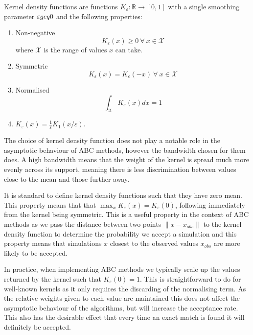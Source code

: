 \documentclass[11pt,a4paper]{article}
\theoremstyle{break}
\begin{document}
  \begin{box_definition}
    Kernel density functions are functions $K_\varepsilon:\mathbb{R}\to[0,1]$ with a single smoothing parameter $\varepsilon\\geq0$ and the following properties:
    \begin{enumerate}
      \item Non-negative
      \[ K_\varepsilon(x)\geq0\ \forall\ x\in\mathcal{X} \]
      where $\mathcal{X}$ is the range of values $x$ can take.
      \item Symmetric
      \[ K_\varepsilon(x)=K_\varepsilon(-x)\ \forall\ x\in\mathcal{X} \]
      \item Normalised
      \[ \int_{\mathcal{X}}K_\varepsilon(x)dx=1 \]
      \item $K_\varepsilon(x)=\frac1\varepsilon K_1(x/\varepsilon)$.
    \end{enumerate}
  \end{box_definition}

  \par The choice of kernel density function does not play a notable role in the asymptotic behaviour of ABC methods, however the bandwidth chosen for them does. A high bandwidth means that the weight of the kernel is spread much more evenly across its support, meaning there is less discrimination between values close to the mean and those further away.

  \par It is standard to define kernel density functions such that they have zero mean. This property means that that $\max_xK_\varepsilon(x)=K_\varepsilon(0)$, following immediately from the kernel being symmetric. This is a useful property in the context of ABC methods as we pass the distance between two points $\|x-x_{obs}\|$ to the kernel density function to determine the probability we accept a simulation and this property means that simulations $x$ closest to the observed values $x_{obs}$ are more likely to be accepted.

  \par In practice, when implementing ABC methods we typically scale up the values returned by the kernel such that $K_\varepsilon(0)=1$. This is straightforward to do for well-known kernels as it only requires the discarding of the normalising term. As the relative weights given to each value are maintained this does not affect the asymptotic behaviour of the algorithms, but will increase the acceptance rate. This also has the desirable effect that every time an exact match is found it will definitely be accepted.
\end{document}
